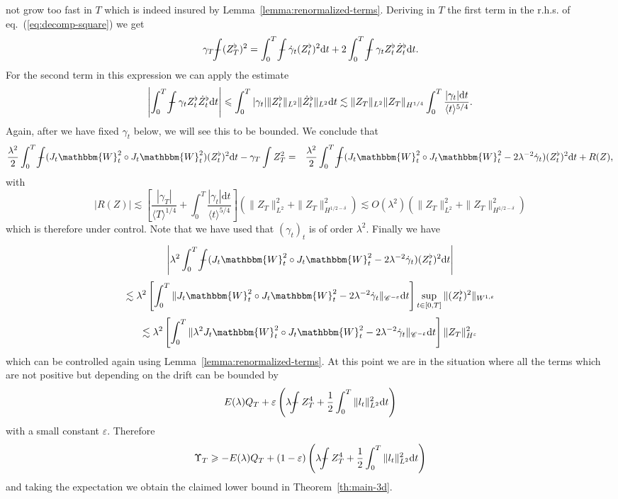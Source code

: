 \documentclass[11pt, oneside]{article}   	%
\newcommand{\mathd}{\mathrm{d}}
\def\Xint#1{\mathchoice
{\XXint\displaystyle\textstyle{#1}}%
{\XXint\textstyle\scriptstyle{#1}}%
{\XXint\scriptstyle\scriptscriptstyle{#1}}%
{\XXint\scriptscriptstyle\scriptscriptstyle{#1}}%
\!\int}
\def\XXint#1#2#3{{\setbox0=\hbox{$#1{#2#3}{\int}$ }
\vcenter{\hbox{$#2#3$ }}\kern-.6\wd0}}
\def\dashint{\Xint-}
\newcommand{\bint}{\dashint}
\newcommand{\VV}{\mathscr{C}}
\begin{document}
not grow too fast in $T$ which is indeed insured by
Lemma~\ref{lemma:renormalized-terms}. Deriving in $T$ the first term in the
r.h.s. of eq.~(\ref{eq:decomp-square}) we get
\[ \gamma_T \bint (Z^{\flat}_T)^2 = \int_{0}^T \bint \dot{\gamma}_t
   (Z^{\flat}_t)^2 \mathd t + 2 \int^T_{0} \bint \gamma_t Z^{\flat}_t
   \dot{Z}_t^{\flat} \mathd t. \]
For the second term in this expression we can apply the estimate
\[ \left| \int^T_{0} \bint \gamma_t Z^{\flat}_t \dot{Z}_t^{\flat} \mathd t
   \right| \leqslant \int^T_{0} | \gamma_t | \| Z^{\flat}_t \|_{L^2}  \|
   \dot{Z}_t^{\flat} \|_{L^2} \mathd t \lesssim \| Z_T \|_{L^2}  \| Z_T
   \|_{H^{1 / 4}} \int^T_{0} \frac{| \gamma_t | \mathd t}{\langle t
   \rangle^{5 / 4}} . \]
Again, after we have fixed $\gamma_t$ below, we will see this to be bounded.
We conclude that
\begin{eqnarray*}
  \frac{\lambda^2}{2} \int_0^T \bint (J_t \mathbbm{W}^2_t \circ J_t
  \mathbbm{W}^2_t ) (Z^{\flat}_t)^2 \mathd t - \gamma_T \int Z^2_T & = &
  \frac{\lambda^2}{2} \int_0^T \bint (J_t \mathbbm{W}^2_t \circ J_t
  \mathbbm{W}^2_t - 2 \lambda^{- 2} \dot{\gamma}_t) (Z^{\flat}_t)^2 \mathd t +
  R (Z),
\end{eqnarray*}
with
\[ | R (Z) | \lesssim \left[ \frac{| \gamma_T |}{\langle T \rangle^{1 / 4}} +
   \int^T_{0} \frac{| \gamma_t | \mathd t}{\langle t \rangle^{5 / 4}}
   \right] (\| Z_T \|^2_{L^2} + \| Z_T \|^2_{H^{1 / 2 - \delta}}) \lesssim O
   (\lambda^2) (\| Z_T \|^2_{L^2} + \| Z_T \|^2_{H^{1 / 2 - \delta}}) \]
which is therefore under control. Note that we have used that $(\gamma_t)_t$
is of order $\lambda^2$. Finally we have
\[ \left| \lambda^2 \int_0^T \bint (J_t \mathbbm{W}^2_t \circ J_t
   \mathbbm{W}^2_t - 2 \lambda^{- 2} \dot{\gamma}_t) (Z^{\flat}_t)^2 \mathd t
   \right| \]
\[ \lesssim \lambda^2 \left[ \int_0^T \| J_t \mathbbm{W}^2_t \circ J_t
   \mathbbm{W}^2_t - 2 \lambda^{- 2} \dot{\gamma}_t \|_{\VV^{- \varepsilon}}
   \mathd t \right] \sup_{t \in [0, T]} \| (Z^{\flat}_t)^2 \|_{W^{1,
   \varepsilon}} \]
\[ \lesssim \lambda^2 \left[ \int_0^T \| \lambda^2 J_t \mathbbm{W}^2_t \circ
   J_t \mathbbm{W}^2_t - 2 \lambda^{- 2} \dot{\gamma}_t \|_{\VV^{-
   \varepsilon}} \mathd t \right] \| Z_T \|_{H^{\varepsilon}}^2 \]
which can be controlled again using Lemma~\ref{lemma:renormalized-terms}. At
this point we are in the situation where all the terms which are not positive
but depending on the drift can be bounded by
\[ E (\lambda) Q_T + \varepsilon \left( \lambda \bint  Z_T^4 + \frac{1}{2}
   \int_0^T \| l_t \|^2_{L^2} \mathd t \right) \]
with a small constant $\varepsilon$. Therefore
\[ \Upsilon_T \geqslant - E (\lambda) Q_T + (1 - \varepsilon) \left( \lambda
   \bint  Z_T^4 + \frac{1}{2} \int_0^T \| l_t \|^2_{L^2} \mathd t \right)
\]
and taking the expectation we obtain the claimed lower bound in
Theorem~\ref{th:main-3d}.
\end{document}
